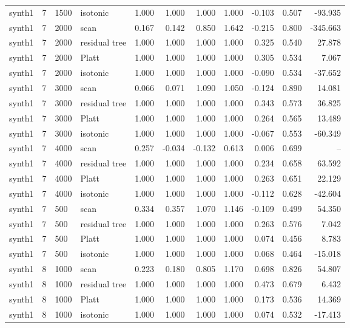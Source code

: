 \begin{tabular}{lrllrrrrrrr}
synth1 & 7 & 1500 & isotonic & 1.000 & 1.000 & 1.000 & 1.000 & -0.103 & 0.507 & -93.935 \\
synth1 & 7 & 2000 & scan & 0.167 & 0.142 & 0.850 & 1.642 & -0.215 & 0.800 & -345.663 \\
synth1 & 7 & 2000 & residual tree & 1.000 & 1.000 & 1.000 & 1.000 & 0.325 & 0.540 & 27.878 \\
synth1 & 7 & 2000 & Platt & 1.000 & 1.000 & 1.000 & 1.000 & 0.305 & 0.534 & 7.067 \\
synth1 & 7 & 2000 & isotonic & 1.000 & 1.000 & 1.000 & 1.000 & -0.090 & 0.534 & -37.652 \\
synth1 & 7 & 3000 & scan & 0.066 & 0.071 & 1.090 & 1.050 & -0.124 & 0.890 & 14.081 \\
synth1 & 7 & 3000 & residual tree & 1.000 & 1.000 & 1.000 & 1.000 & 0.343 & 0.573 & 36.825 \\
synth1 & 7 & 3000 & Platt & 1.000 & 1.000 & 1.000 & 1.000 & 0.264 & 0.565 & 13.489 \\
synth1 & 7 & 3000 & isotonic & 1.000 & 1.000 & 1.000 & 1.000 & -0.067 & 0.553 & -60.349 \\
synth1 & 7 & 4000 & scan & 0.257 & -0.034 & -0.132 & 0.613 & 0.006 & 0.699 & -- \\
synth1 & 7 & 4000 & residual tree & 1.000 & 1.000 & 1.000 & 1.000 & 0.234 & 0.658 & 63.592 \\
synth1 & 7 & 4000 & Platt & 1.000 & 1.000 & 1.000 & 1.000 & 0.263 & 0.651 & 22.129 \\
synth1 & 7 & 4000 & isotonic & 1.000 & 1.000 & 1.000 & 1.000 & -0.112 & 0.628 & -42.604 \\
synth1 & 7 & 500 & scan & 0.334 & 0.357 & 1.070 & 1.146 & -0.109 & 0.499 & 54.350 \\
synth1 & 7 & 500 & residual tree & 1.000 & 1.000 & 1.000 & 1.000 & 0.263 & 0.576 & 7.042 \\
synth1 & 7 & 500 & Platt & 1.000 & 1.000 & 1.000 & 1.000 & 0.074 & 0.456 & 8.783 \\
synth1 & 7 & 500 & isotonic & 1.000 & 1.000 & 1.000 & 1.000 & 0.068 & 0.464 & -15.018 \\
synth1 & 8 & 1000 & scan & 0.223 & 0.180 & 0.805 & 1.170 & 0.698 & 0.826 & 54.807 \\
synth1 & 8 & 1000 & residual tree & 1.000 & 1.000 & 1.000 & 1.000 & 0.473 & 0.679 & 6.432 \\
synth1 & 8 & 1000 & Platt & 1.000 & 1.000 & 1.000 & 1.000 & 0.173 & 0.536 & 14.369 \\
synth1 & 8 & 1000 & isotonic & 1.000 & 1.000 & 1.000 & 1.000 & 0.074 & 0.532 & -17.413 \\

\end{tabular}
